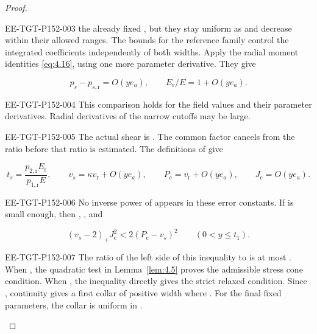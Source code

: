 \begin{proof}
\begin{EESegment}{EE-TGT-P152-003}
the already fixed , but they stay uniform as
 and  decrease within their allowed ranges.
The bounds for the reference family control the integrated coefficients independently of both
widths. Apply the radial moment identities \eqref{eq:4.16}, using one more parameter derivative.
They give
\end{EESegment}
\begin{equation}
  p_s-p_{s,\mathrm r}=O(ye_a),
  \qquad
  E_{\mathrm r}/E=1+O(ye_a).
\tag{B.28}\label{eq:B.28}
\end{equation}
\begin{EESegment}{EE-TGT-P152-004}
This comparison holds for the field values and their parameter derivatives. Radial derivatives of
the narrow cutoffs may be large.
\end{EESegment}

\begin{EESegment}{EE-TGT-P152-005}
The actual shear is
. The common factor
 cancels from the ratio  before that
ratio is estimated. The definitions of 
give
\end{EESegment}
\begin{equation}
  t_s=\frac{p_{2,\mathrm r}E_{\mathrm r}}{p_{1,\mathrm r}E},\qquad
  v_s=\kappa v_{\mathrm r}+O(ye_a),\qquad
  P_{\mathrm c}=v_{\mathrm r}+O(ye_a),\qquad
  J_{\mathrm c}=O(ye_a).
\tag{B.29}\label{eq:B.29}
\end{equation}
\begin{EESegment}{EE-TGT-P152-006}
No inverse power of  appears in these error constants. If
 is small enough, then
,
, and
\end{EESegment}
\[
  (v_s-2)_+J_{\mathrm c}^2<2(P_{\mathrm c}-v_s)^2
  \qquad(0<y\leq t_1).
\]
\begin{EESegment}{EE-TGT-P152-007}
The ratio of the left side of this inequality to
 is at most . When
, the quadratic test in Lemma~\ref{lem:4.5} proves the admissible stress
cone condition. When , the inequality
 directly gives the strict relaxed condition. Since
, continuity gives a first collar of positive width where
. For the final fixed parameters, the collar is uniform in
.
\end{EESegment}


\end{proof}
